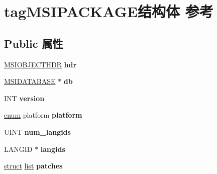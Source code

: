 \hypertarget{structtag_m_s_i_p_a_c_k_a_g_e}{}\section{tag\+M\+S\+I\+P\+A\+C\+K\+A\+G\+E结构体 参考}
\label{structtag_m_s_i_p_a_c_k_a_g_e}
\subsection*{Public 属性}
\begin{DoxyCompactItemize}
\item 
\mbox{\label{structtag_m_s_i_p_a_c_k_a_g_e_a4dc2c2e6b21fe90586f5373ed106c105}} 
\hyperlink{structtag_m_s_i_o_b_j_e_c_t_h_d_r}{M\+S\+I\+O\+B\+J\+E\+C\+T\+H\+DR} {\bfseries hdr}
\item 
\mbox{\label{structtag_m_s_i_p_a_c_k_a_g_e_a5a96e8e18f7dcb8860ed756aee1566e5}} 
\hyperlink{structtag_m_s_i_d_a_t_a_b_a_s_e}{M\+S\+I\+D\+A\+T\+A\+B\+A\+SE} $\ast$ {\bfseries db}
\item 
\mbox{\label{structtag_m_s_i_p_a_c_k_a_g_e_ab0e3623329e97cca5c6d2ea411acce3d}} 
I\+NT {\bfseries version}
\item 
\mbox{\label{structtag_m_s_i_p_a_c_k_a_g_e_a5df33eada542047f9498cfbe570b27de}} 
\hyperlink{interfaceenum}{enum} platform {\bfseries platform}
\item 
\mbox{\label{structtag_m_s_i_p_a_c_k_a_g_e_a893a040e3d4959b54112817076168236}} 
U\+I\+NT {\bfseries num\+\_\+langids}
\item 
\mbox{\label{structtag_m_s_i_p_a_c_k_a_g_e_aada9ad74d7858a746bf087d247b3de39}} 
L\+A\+N\+G\+ID $\ast$ {\bfseries langids}
\item 
\mbox{\label{structtag_m_s_i_p_a_c_k_a_g_e_addafbb0b12b138adc72e8d4f1dfd2c4a}} 
\hyperlink{interfacestruct}{struct} \hyperlink{classlist}{list} {\bfseries patches}
\item 
\mbox{\label{structtag_m_s_i_p_a_c_k_a_g_e_a9247a496bb88aa9cb330ab4478dcacbf}} 

\end{DoxyCompactItemize}

